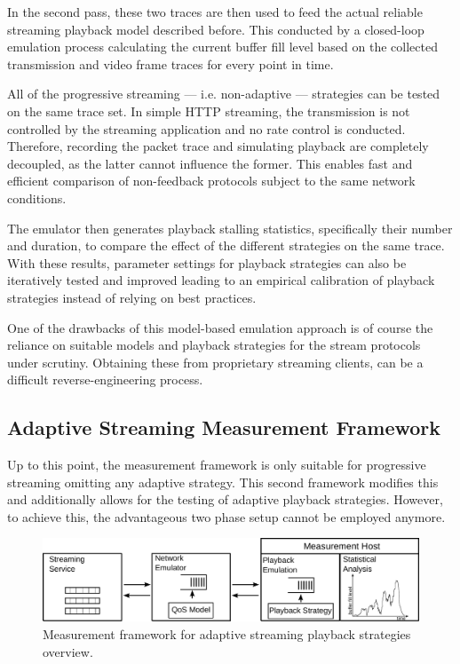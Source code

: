 In the second pass, these two traces are then used to feed the actual reliable streaming playback model described before. This conducted by a closed-loop emulation process calculating the current buffer fill level based on the collected transmission and video frame traces for every point in time. 

All of the progressive streaming --- i.e. non-adaptive --- strategies can be tested on the same trace set.
In simple \gls{HTTP} streaming, the transmission is not controlled by the streaming application and no rate control is conducted. Therefore, recording the packet trace and simulating playback are completely decoupled, as the latter cannot influence the former.  This enables fast and efficient comparison of non-feedback protocols subject to the same network conditions.

The emulator then generates playback stalling statistics, specifically their number and duration, to compare the effect of the different strategies on the same trace. With these results, parameter settings for playback strategies can also be iteratively tested and improved leading to an empirical calibration of playback strategies instead of relying on best practices.

One of the drawbacks of this model-based emulation approach is of course the reliance on suitable models and playback strategies for the stream protocols under scrutiny. Obtaining these from proprietary streaming clients, can be a difficult reverse-engineering process.


\subsection{Adaptive Streaming Measurement Framework}

Up to this point, the measurement framework is only suitable for progressive streaming omitting any adaptive strategy. This second framework modifies this and additionally allows for the testing of adaptive playback strategies. However, to achieve this, the advantageous two phase setup cannot be employed anymore.

\begin{figure}[htb]
    \includegraphics[width=1.0\textwidth]{images/feedback-measurement-model.pdf}
    \caption{Measurement framework for adaptive streaming playback strategies overview.}
    \label{c3:fig:framework-feedback}
\end{figure}

